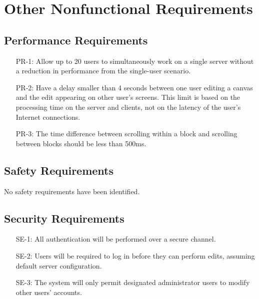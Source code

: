 \documentclass[11pt,oneside,a4paper]{article}
\begin{document}
\section{Other Nonfunctional Requirements}
\subsection{Performance Requirements}
\begin{itemize}
\item[PR-1:] Allow up to 20 users to simultaneously work on a single server without a reduction in performance from the single-user scenario.
\item[PR-2:] Have a delay smaller than 4 seconds between one user editing a canvas and the edit appearing on other user's screens. This limit is based on the processing time on the server and clients, not on the latency of the user's Internet connections.
\item[PR-3:] The time difference between scrolling within a block and scrolling between blocks should be less than 500ms.
\end{itemize}
\subsection{Safety Requirements}
No safety requirements have been identified.
\subsection{Security Requirements}
\begin{itemize}
\item[SE-1:] All authentication will be performed over a secure channel.
\item[SE-2:] Users will be required to log in before they can perform edits, assuming default server configuration.
\item[SE-3:] The system will only permit designated administrator users to modify other users' accounts.
\end{itemize}
\end{document}
